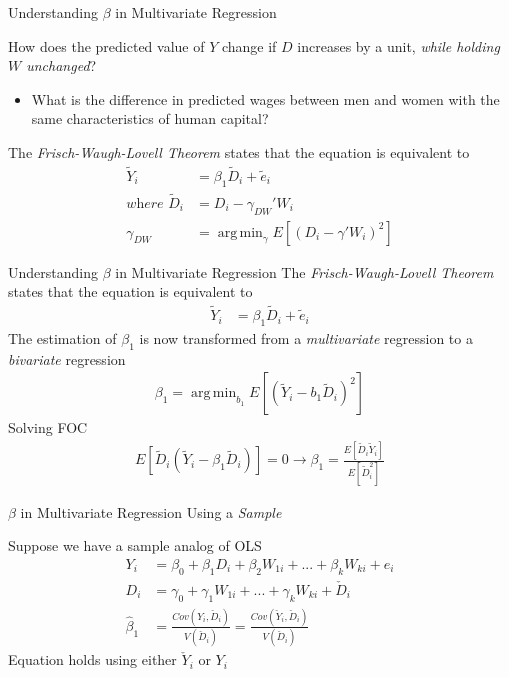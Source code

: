 \documentclass[aspectratio=1610,12pt,xcolor=dvipsnames]{beamer}
\DeclareMathOperator*{\argmin}{arg\,min}
\begin{document}
\begin{frame}{Understanding $\beta$ in Multivariate Regression}

How does the predicted value of $Y$ change if $D$ increases by a unit, \textit{while holding $W$ unchanged}?
\begin{itemize}
    \item What is the difference in predicted wages between men and women with the same characteristics of human capital?
\end{itemize} \pause

The \textit{Frisch-Waugh-Lovell Theorem} states that the equation is equivalent to
\begin{align*}
\tilde{Y}_i &= \beta_1\tilde{D}_i + \tilde{e}_i \\
\textit{where } \tilde{D}_i &= D_i - \gamma_{DW}' W_i \\
\gamma_{DW} &= \argmin_{\gamma} E\left[ (D_i - \gamma'W_i)^2 \right]
\end{align*}
\end{frame}

\begin{frame}{Understanding $\beta$ in Multivariate Regression}
The \textit{Frisch-Waugh-Lovell Theorem} states that the equation is equivalent to
\begin{align*}
\tilde{Y}_i &= \beta_1\tilde{D}_i + \tilde{e}_i
\end{align*}
The estimation of $\beta_1$ is now transformed from a \textit{multivariate} regression to a \textit{bivariate} regression
\begin{align*}
    \beta_1 = \argmin_{b_1} E[(\tilde{Y}_i - b_1 \tilde{D}_i)^2]
\end{align*}
Solving FOC
\begin{align*}
  E[\tilde{D}_i(\tilde{Y}_i - \beta_1\tilde{D}_i)] =0\rightarrow \beta_1 = \frac{E[\tilde{D}_i\tilde{Y}_i]}{E[\tilde{D}_i^2]}
\end{align*}
\end{frame}

\begin{frame}{$\beta$ in Multivariate Regression Using a \textit{Sample}}

Suppose we have a sample analog of OLS
\begin{align*}
    Y_i &= \beta_0 + \beta_1 D_i + \beta_2 W_{1i} + ... + \beta_k W_{ki} + e_i \\
    D_i &= \gamma_0 + \gamma_1W_{1i} + ... + \gamma_kW_{ki} + \check{D}_i \\
    \hat \beta_1 &= \frac{Cov(Y_i,\check{D}_i)}{V(\check{D}_i)} = \frac{Cov(\check{Y}_i,\check{D}_i)}{V(\check{D}_i)}
\end{align*}
Equation holds using either $\check{Y}_i$ or $Y_i$
\end{frame}
\end{document}
